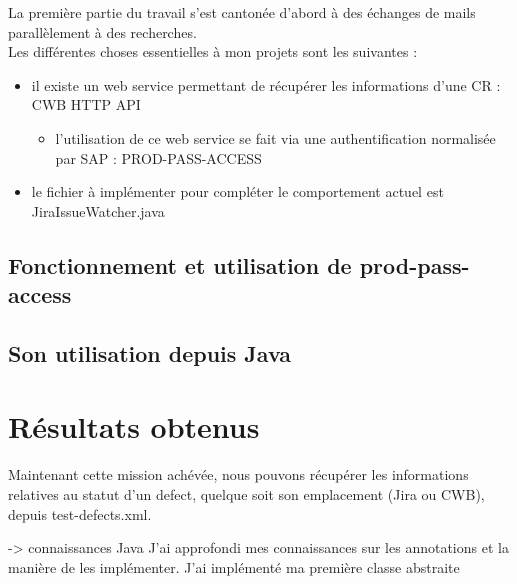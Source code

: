 La première partie du travail s'est cantonée d'abord à des échanges de mails parallèlement à des recherches.\\
Les différentes choses essentielles à mon projets sont les suivantes :

\begin{itemize}
	\item il existe un web service permettant de récupérer les informations d'une CR : CWB HTTP API
	\begin{itemize}
		\item l'utilisation de ce web service se fait via une authentification normalisée par SAP : PROD-PASS-ACCESS
	\end{itemize}
	\item le fichier à implémenter pour compléter le comportement actuel est JiraIssueWatcher.java	
\end{itemize}




\subsection{Fonctionnement et utilisation de prod-pass-access}



\subsection{Son utilisation depuis Java}



\section{Résultats obtenus}
Maintenant cette mission achévée, nous pouvons récupérer les informations relatives au statut d'un defect, quelque soit son emplacement (Jira ou CWB), depuis test-defects.xml.



-> connaissances Java
J'ai approfondi mes connaissances sur les annotations et la manière de les implémenter.
J'ai implémenté ma première classe abstraite 

